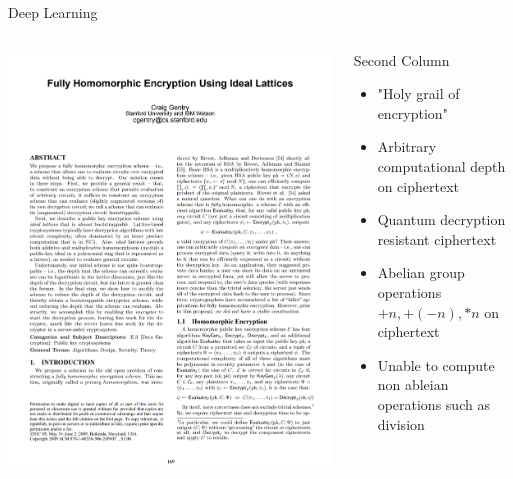 \documentclass[aspectratio=169]{beamer}
\begin{document}
    \begin{frame}{Deep Learning}
      \begin{columns}
        \begin{column}{0.5\textwidth}
          \includegraphics[width=0.8\linewidth]{gentry.png}
        \end{column}
        \begin{column}{0.5\textwidth}
          Second Column\\[.2cm]
          \begin{itemize}
            \item "Holy grail of encryption"
            \item Arbitrary computational depth on ciphertext
            \item Quantum decryption resistant ciphertext
            \item Abelian group operations ${+n,+(-n),*n}$ on ciphertext
            \item Unable to compute non ableian operations such as division
          \end{itemize}
        \end{column}
      \end{columns}
    \end{frame}
\end{document}

